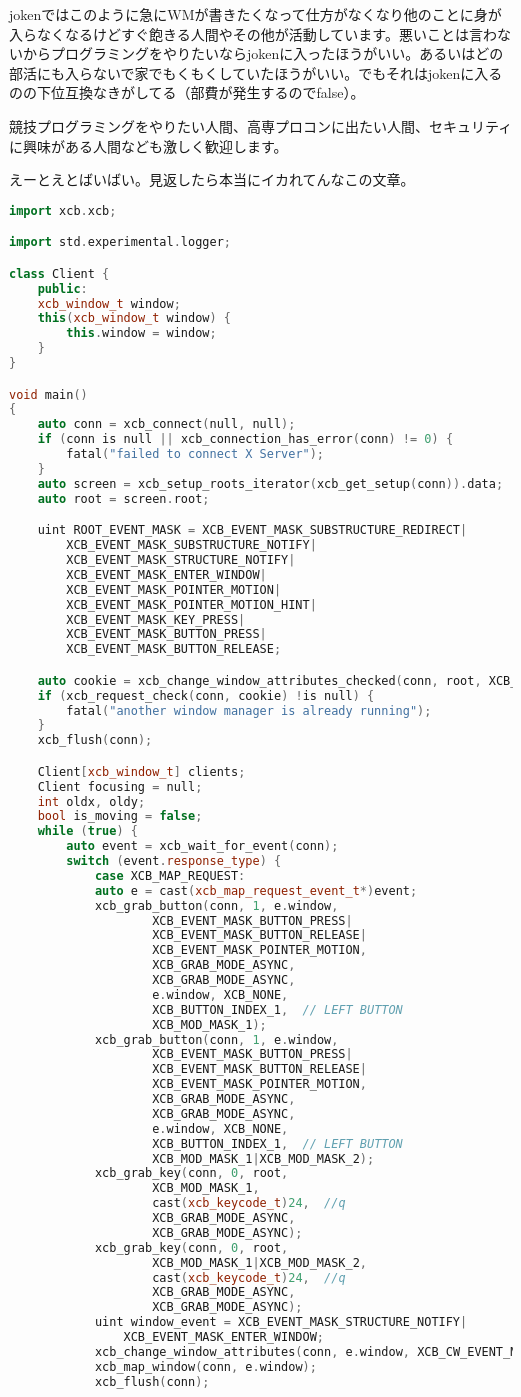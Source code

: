 \documentclass[12pt,a4paper]{jsarticle}
\begin{document}
jokenではこのように急にWMが書きたくなって仕方がなくなり他のことに身が入らなくなるけどすぐ飽きる人間やその他が活動しています。悪いことは言わないからプログラミングをやりたいならjokenに入ったほうがいい。あるいはどの部活にも入らないで家でもくもくしていたほうがいい。でもそれはjokenに入るのの下位互換なきがしてる（部費が発生するのでfalse）。

競技プログラミングをやりたい人間、高専プロコンに出たい人間、セキュリティに興味がある人間なども激しく歓迎します。

えーとえとばいばい。見返したら本当にイカれてんなこの文章。


\begin{lstlisting}[language=C++]
import xcb.xcb;

import std.experimental.logger;

class Client {
	public:
	xcb_window_t window;
	this(xcb_window_t window) {
		this.window = window;
	}
}

void main()
{
	auto conn = xcb_connect(null, null);
	if (conn is null || xcb_connection_has_error(conn) != 0) {
		fatal("failed to connect X Server");
	}
	auto screen = xcb_setup_roots_iterator(xcb_get_setup(conn)).data;
	auto root = screen.root;

	uint ROOT_EVENT_MASK = XCB_EVENT_MASK_SUBSTRUCTURE_REDIRECT|
		XCB_EVENT_MASK_SUBSTRUCTURE_NOTIFY|
		XCB_EVENT_MASK_STRUCTURE_NOTIFY|
		XCB_EVENT_MASK_ENTER_WINDOW|
		XCB_EVENT_MASK_POINTER_MOTION|
		XCB_EVENT_MASK_POINTER_MOTION_HINT|
		XCB_EVENT_MASK_KEY_PRESS|
		XCB_EVENT_MASK_BUTTON_PRESS|
		XCB_EVENT_MASK_BUTTON_RELEASE;

	auto cookie = xcb_change_window_attributes_checked(conn, root, XCB_CW_EVENT_MASK, &ROOT_EVENT_MASK);
	if (xcb_request_check(conn, cookie) !is null) {
		fatal("another window manager is already running");		
	}
	xcb_flush(conn);

	Client[xcb_window_t] clients;
	Client focusing = null;
	int oldx, oldy;
	bool is_moving = false;
	while (true) {
		auto event = xcb_wait_for_event(conn);
		switch (event.response_type) {
			case XCB_MAP_REQUEST:
			auto e = cast(xcb_map_request_event_t*)event;
			xcb_grab_button(conn, 1, e.window,
					XCB_EVENT_MASK_BUTTON_PRESS|
					XCB_EVENT_MASK_BUTTON_RELEASE|
					XCB_EVENT_MASK_POINTER_MOTION,
					XCB_GRAB_MODE_ASYNC,
					XCB_GRAB_MODE_ASYNC,
					e.window, XCB_NONE,
					XCB_BUTTON_INDEX_1,  // LEFT BUTTON
					XCB_MOD_MASK_1);
			xcb_grab_button(conn, 1, e.window,
					XCB_EVENT_MASK_BUTTON_PRESS|
					XCB_EVENT_MASK_BUTTON_RELEASE|
					XCB_EVENT_MASK_POINTER_MOTION,
					XCB_GRAB_MODE_ASYNC,
					XCB_GRAB_MODE_ASYNC,
					e.window, XCB_NONE,
					XCB_BUTTON_INDEX_1,  // LEFT BUTTON
					XCB_MOD_MASK_1|XCB_MOD_MASK_2);
			xcb_grab_key(conn, 0, root,
					XCB_MOD_MASK_1,
					cast(xcb_keycode_t)24,  //q
					XCB_GRAB_MODE_ASYNC,
					XCB_GRAB_MODE_ASYNC);
			xcb_grab_key(conn, 0, root,
					XCB_MOD_MASK_1|XCB_MOD_MASK_2,
					cast(xcb_keycode_t)24,  //q
					XCB_GRAB_MODE_ASYNC,
					XCB_GRAB_MODE_ASYNC);
			uint window_event = XCB_EVENT_MASK_STRUCTURE_NOTIFY|
				XCB_EVENT_MASK_ENTER_WINDOW;
			xcb_change_window_attributes(conn, e.window, XCB_CW_EVENT_MASK, &window_event);
			xcb_map_window(conn, e.window);
			xcb_flush(conn);


\end{lstlisting}
\end{document}
